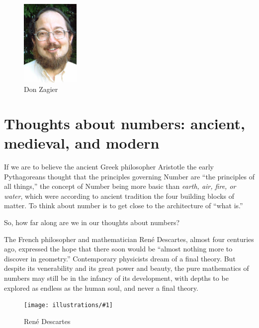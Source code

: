\documentclass[11pt]{article}
\newcommand{\ill}[3]{ 
   \begin{figure}[htbp]
   \begin{center}
   \texttt{[image: illustrations/\#1]}
   \caption{#3}
   \end{center}
    \end{figure}
}
\theoremstyle{plain}
\theoremstyle{definition}
\numberwithin{equation}{section}
\numberwithin{figure}{section}
\numberwithin{table}{section}
\begin{document}
\begin{figure}[ht]\label{fig:zagier}
\begin{center}
\includegraphics[width=0.25\textwidth]{illustrations/zagier}
\caption{Don Zagier}
\end{center}
\end{figure}

\section{Thoughts about numbers: ancient, medieval, and modern}

If we are to believe the ancient Greek philosopher Aristotle the early
Pythagoreans thought that the principles governing Number are ``the
principles of all things,'' the concept of Number being more basic than
{\em earth, air, fire, or water}, which were according to ancient tradition
the four building blocks of matter. To think about number is to get
close to the architecture of ``what is.''

So, how far along are we in our thoughts about numbers?

The French philosopher and mathematician Ren\'e Descartes, almost four
centuries ago, expressed the hope that there soon would be ``almost
nothing more to discover in geometry.'' Contemporary physicists dream
of a final theory.  But despite its
venerability and its great power and beauty, the pure mathematics of
numbers may still be in the infancy of its development, with depths to
be explored as endless as the human soul, and never a final theory.



\ill{descartes}{.3}{Ren\'e Descartes}
\end{document}
